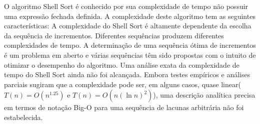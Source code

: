 O algoritmo Shell Sort é conhecido por sua complexidade de tempo não possuir uma expressão fechada definida\cite{sedgewick1986shell}. A complexidade deste algoritmo tem as seguintes características:
A complexidade do Shell Sort é altamente dependente da escolha da sequência de incrementos. Diferentes sequências produzem diferentes complexidades de tempo. A determinação de uma sequência ótima de incrementos é um problema em aberto e várias sequências têm sido propostas com o intuito de otimizar o desempenho do algoritmo.
Uma análise exata da complexidade de tempo do Shell Sort ainda não foi alcançada. Embora testes empíricos e análises parciais sugiram que a complexidade pode ser, em alguns casos, quase linear(\( T(n) = O(n^{1.25}) \) e \( T(n) = O(n (\ln n)^2) \)), uma descrição analítica precisa em termos de notação Big-O para uma sequência de lacunas arbitrária não foi estabelecida.
